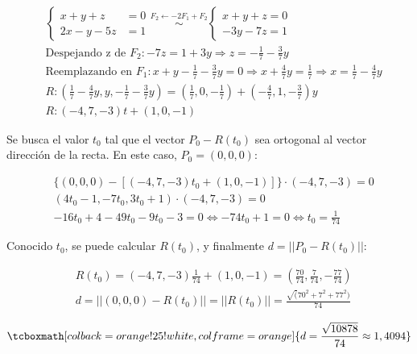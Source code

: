 \documentclass{article}
\begin{document}
\begin{enumerate}[(a)]
\begin{subequations}
\begin{align}
& \left\{ \begin{array}{lr}
x + y + z &= 0 \\
2x - y - 5z &= 1
\end{array} \right. \overset{F_2 \leftarrow -2F_1 + F_2}{\sim} \left\{ \begin{array}{ll}
x + y + z = 0 \\
-3y -7z = 1
\end{array} \right. \\
& \text{Despejando z de } F_2: -7z = 1 + 3y \Rightarrow z = -\frac{1}{7} -\frac{3}{7} y \\
& \text{Reemplazando en } F_1: x + y - \frac{1}{7} -\frac{3}{7} y = 0 \Rightarrow x + \frac{4}{7} y = \frac{1}{7} \Rightarrow x = \frac{1}{7} -\frac{4}{7} y \\
& R: \left( \frac{1}{7} -\frac{4}{7}y, y, -\frac{1}{7} -\frac{3}{7} y \right) = \left( \frac{1}{7}, 0, -\frac{1}{7} \right) + \left( -\frac{4}{7}, 1, -\frac{3}{7} \right) y \\
& R: (-4, 7, -3) t + (1, 0, -1)
\end{align}
\end{subequations}

Se busca el valor $t_0$ tal que el vector $P_0 - R(t_0)$ sea ortogonal al vector dirección de la recta. En este caso, $P_0 = (0, 0, 0)$:

\begin{subequations}
\begin{align}
& \{(0, 0, 0) - [(-4, 7, -3) t_0 + (1, 0, -1)]\} \cdot (-4, 7, -3) = 0 \\
& (4 t_0 - 1, -7 t_0, 3 t_0 + 1) \cdot (-4, 7, -3) = 0 \\
& -16 t_0 + 4 -49 t_0 -9 t_0 -3 = 0 \Leftrightarrow -74 t_0 + 1 = 0 \Leftrightarrow t_0 = \frac{1}{74} 
\end{align}
\end{subequations}

Conocido $t_0$, se puede calcular $R(t_0)$, y finalmente $d = ||P_0 - R(t_0)||$:

\begin{subequations}
\begin{align}
& R(t_0) = (-4, 7, -3) \frac{1}{74} + (1, 0, -1) = \left( \frac{70}{74}, \frac{7}{74}, -\frac{77}{74} \right) \\
& d = ||(0,0,0) - R(t_0)|| = ||R(t_0)|| = \frac{\sqrt(70^2 + 7^2 + 77^2)}{74}
\end{align}
\end{subequations}

\begin{equation}
\tcboxmath[colback=orange!25!white,colframe=orange]
{ d = \frac{\sqrt{10878}}{74} \approx 1,4094 }
\end{equation}

\end{enumerate}
\end{document}
